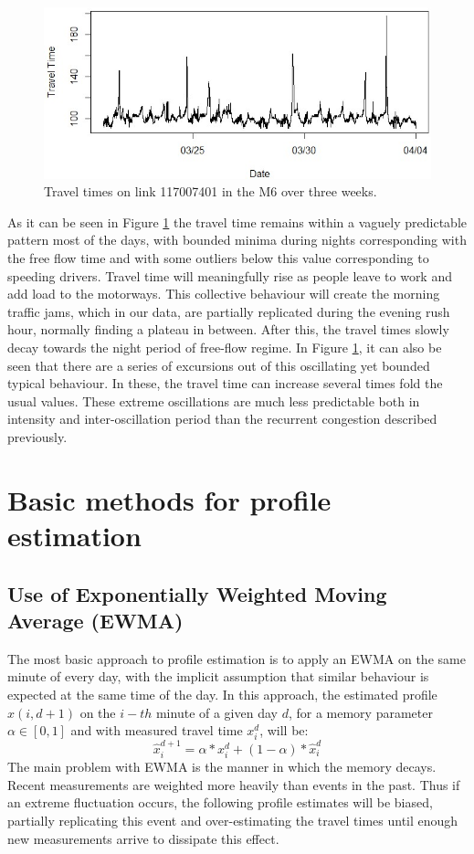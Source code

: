 \documentclass[letterpaper, 10 pt, conference]{ieeeconf}  %
\begin{document}
\begin{figure}[htbp]
	\centerline{\includegraphics[width=\linewidth]{./images/Traveltime_example2.jpg}}
	\caption{Travel times on link 117007401 in the M6 over three weeks.}
	\label{fig:travel_time_example}
\end{figure}

As it can be seen in Figure \ref{fig:travel_time_example} the travel time remains within a vaguely predictable pattern most of the days, with bounded minima during nights corresponding with the free flow time and with some outliers below this value corresponding to speeding drivers. 
Travel time will meaningfully rise as people leave to work and add load to the motorways. 
This collective behaviour will create the morning traffic jams, which in our data, are partially replicated during the evening rush hour, normally finding a plateau in between. 
After this, the travel times slowly decay towards the night period of free-flow regime.
In Figure \ref{fig:travel_time_example}, it can also be seen that there are a series of excursions out of this oscillating yet bounded typical behaviour. 
In these, the travel time can increase several times fold the usual values.
These extreme oscillations are much less predictable both in intensity and inter-oscillation period than the recurrent congestion described previously.

\section{Basic methods for profile estimation}
\subsection{Use of Exponentially Weighted Moving Average (EWMA)} \label{ewma}
The most basic approach to profile estimation is to apply an EWMA on the same minute of every day, with the implicit assumption that similar behaviour is expected at the same time of the day. 
In this approach, the estimated profile $\hat{x}(i,d+1)$ on the $i-th$ minute of a given day $d$, for a memory parameter $\alpha \in [0,1]$ and with measured travel time $x_i^d$, will be:
\begin{equation}
\hat{x}^{d+1}_i = \alpha * x^{d}_{i} + (1-\alpha)*\hat{x}^{d}_{i}
\end{equation}
The main problem with EWMA is the manner in which the memory decays. 
Recent measurements are weighted more heavily than events in the past. Thus if an extreme fluctuation occurs,  the following profile estimates will be biased, partially replicating this event and over-estimating the travel times until enough new measurements arrive to dissipate this effect.
\end{document}
